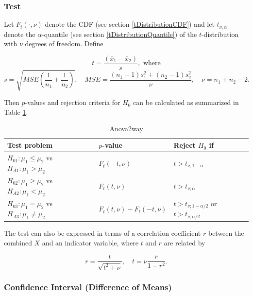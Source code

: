 \subsubsection{Test}
\label{Anova2way_Test}
Let $F_t\left(\cdot, \nu\right)$ denote the CDF (see section \ref{tDistributionCDF}) and let $t_{\nu,\alpha}$ denote the $\alpha$-quantile (see section \ref{tDistributionQuantile}) of the $t$-distribution with $\nu$ degrees of freedom. Define

\begin{equation}
	t= \frac{(\overline{x}_1-\overline{x}_2)}{s}, \text{ where}
\end{equation}
\begin{equation} \label{eq:Anova2way}
	s = \sqrt{\textit{MSE}\left(\frac{1}{n_1}+\frac{1}{n_2}\right)}, \quad \textit{MSE} = \frac{(n_1-1)s_1^2+(n_2-1)s_2^2}{\nu}, \quad \nu=n_1+n_2-2.
\end{equation}

Then $p$-values and rejection criteria for $H_0$ can be calculated as summarized in Table \ref{TableAnova2way}.

\begin{table}[ht]
	\centering
	\begin{tabular}{|l|l|l|}
		\hline
		Test problem & $p$-value & Reject $H_0$ if \\
		\hline
		$H_{01}: \mu_1 \leq \mu_2$ vs $H_{A1}: \mu_1 > \mu_2$ & $F_t\left(-t, \nu\right)$ &$t > t_{\nu;1-\alpha}$ \\
		$H_{02}: \mu_1 \geq \mu_2$ vs $H_{A2}: \mu_1 < \mu_2$ & $F_t\left(t, \nu\right)$  &$t > t_{\nu;\alpha}$ \\
		$H_{03}: \mu_1 = \mu_2$ vs $H_{A3}: \mu_1 \neq \mu_2$ & $F_t\left(t, \nu\right)-F_t\left(-t, \nu\right)$ &$t > t_{\nu;1-\alpha/2}$ or $t > t_{\nu;\alpha/2}$ \\
		\hline
	\end{tabular}
	\caption{Anova2way}
	\label{TableAnova2way}
\end{table}


The test can also be expressed in terms of a correlation coefficient $r$ between the combined $X$ and an indicator variable, where $t$ and $r$ are related by

\begin{equation}
	r=\frac{t}{\sqrt{t^2+\nu}}, \quad t= \nu \frac{r}{1-r^2}.
\end{equation}



\subsubsection{Confidence Interval (Difference of Means)}
\label{Anova2way_CI}

